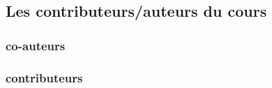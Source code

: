 
\subsection{Les contributeurs/auteurs du cours}

\subsubsection{co-auteurs}



\subsubsection{contributeurs}


